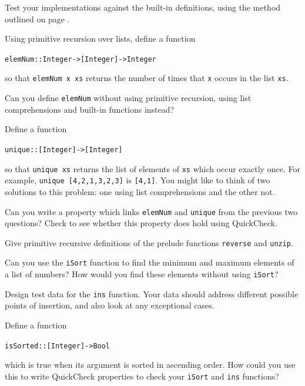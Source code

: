 \begin{exercises}


\item
Test your implementations against the built-in definitions, using the method outlined on page \pageref{qcretest}.


\item Using primitive recursion over lists, define a function
\begin{alltt}
elemNum :: Integer -> [Integer] -> Integer
\end{alltt}
so that \texttt{elemNum x xs} returns the number of times that
\texttt{x} occurs in the list \texttt{xs}. 

Can you define \texttt{elemNum} without using primitive recursion,
using list comprehensions and built-in functions instead?

\item Define a function
\begin{alltt}
unique :: [Integer] -> [Integer]
\end{alltt}
so that \texttt{unique xs} returns the list of elements of \texttt{xs}
which occur exactly once. For example, \texttt{unique [4,2,1,3,2,3]} is
\texttt{[4,1]}. You might like to think of two solutions to this
problem: one using list comprehensions and the other not.

\item 
Can you write a property which links \texttt{elemNum} and \texttt{unique} from the previous two questions? Check to see whether this property does hold using QuickCheck.

\item
Give primitive recursive definitions of the prelude functions
\texttt{reverse} and \texttt{unzip}.


\item Can you use the \texttt{iSort} function to find the minimum and maximum
elements of a list of numbers? How would you find these elements without using
\texttt{iSort}? 

\item
Design test data for the \texttt{ins} function. Your data should address
different possible points of insertion, and also look at any exceptional
cases.

\item
Define a function
\begin{alltt}
isSorted :: [Integer] -> Bool
\end{alltt}
which is true when its argument is sorted in ascending order. How could you use this to write QuickCheck properties to check your \texttt{iSort} and \texttt{ins} functions?


\end{exercises}

